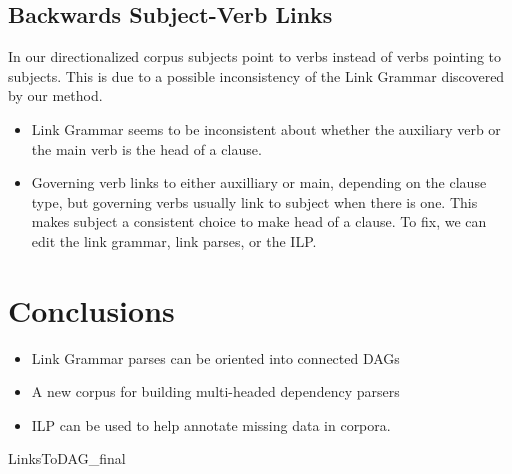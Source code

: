 \documentclass[a0,landscape]{a0poster}
\begin{document}
\begin{multicols}{4}
\vspace{-1cm}
\subsection*{Backwards Subject-Verb Links}
In our directionalized corpus subjects point to verbs instead of verbs pointing to subjects. This is due to a possible inconsistency of the Link Grammar discovered by our method.
\begin{itemize}
\item Link Grammar seems to be inconsistent about whether the auxiliary verb or the main verb is the head of a clause. 
\item Governing verb links to either auxilliary or main, depending on the clause type, but governing verbs usually link to subject when there is one. This makes subject a consistent choice to make head of a clause. To fix, we can edit the link grammar, link parses, or the ILP. 
\end{itemize}
\color{SaddleBrown} %
\vspace{-1cm}
\section*{Conclusions}
\begin{itemize}
\item Link Grammar parses can be oriented into connected DAGs
\item A new corpus for building multi-headed dependency parsers
\item ILP can be used to help annotate missing data in corpora. 
\end{itemize}


\color{DarkSlateGray} %


\begin{bibliography}{LinksToDAG_final}

\end{bibliography}


\end{multicols}
\end{document}
